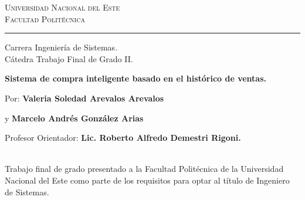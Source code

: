 \vspace*{-3cm}

\thispagestyle{empty}

{\bf
\begin{center}
\large
\vspace*{-1 cm}\Large \textsc{Universidad Nacional del Este} \\
\Large \textsc{Facultad Politécnica} \\
\vspace*{0.5 cm}\hrule
\vspace*{0.5 cm}\Large Carrera Ingeniería de Sistemas.\\
\vspace*{0 cm}\Large Cátedra Trabajo Final de Grado II.\\
\end{center}
}

\vspace{3.5 cm}
{
\noindent
\begin{center}
\huge \bf Sistema de compra inteligente basado en el histórico de ventas. 
\end{center}
}


\vspace{0.5 cm}
{ 

Por: \textbf{\Large Valeria Soledad Arevalos Arevalos}

\hspace{1 cm} y \textbf{\Large Marcelo Andrés González Arias}

\vspace*{.5 cm}
Profesor Orientador: \textbf{\large Lic. Roberto Alfredo Demestri Rigoni.}
}%
\vspace*{0.5 cm}\\
Trabajo final de grado presentado a la Facultad Politécnica de la Universidad Nacional del Este como parte de los requisitos para optar al título de Ingeniero de Sistemas.


\vspace{4.0cm}


